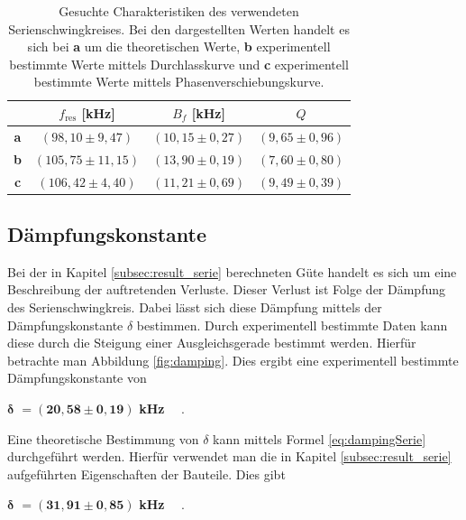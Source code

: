 \documentclass[a4paper,usenatbib]{aspdoc}
\begin{document}
            \begin{table}
                \centering
                \begin{tabular}{c|ccc}
                    \multicolumn{1}{c}{} & \multicolumn{1}{c}{$f_{\mathrm{res}}$ [kHz]} & \multicolumn{1}{c}{$B_f$ [kHz]} & \multicolumn{1}{c}{$Q$} \\
                    \cmidrule(lr){2-2}\cmidrule(lr){3-3} \cmidrule(lr){4-4}
                    \toprule
                    \textbf{a}      & $(98,10 \pm 9,47)$  & $(10,15 \pm 0,27)$ & $(9,65 \pm 0,96)$ \\
                    \textbf{b}      & $(105,75 \pm 11,15)$ & $(13,90 \pm 0,19)$ & $(7,60 \pm 0,80)$ \\
                    \textbf{c}      & $(106,42 \pm 4,40)$ & $(11,21 \pm 0,69)$ & $(9,49 \pm 0,39)$ \\
                    \bottomrule
                \end{tabular}
                \caption{Gesuchte Charakteristiken des verwendeten Serienschwingkreises. Bei den dargestellten Werten handelt es sich bei \textbf{a} um die theoretischen Werte, \textbf{b} experimentell bestimmte Werte mittels Durchlasskurve und \textbf{c} experimentell bestimmte Werte mittels Phasenverschiebungskurve.}
                \label{tab:serie}
            \end{table}
        
        
        \subsection{Dämpfungskonstante}\label{subsec:result_damping}
            Bei der in Kapitel \ref{subsec:result_serie} berechneten Güte handelt es sich um eine Beschreibung der auftretenden Verluste. Dieser Verlust ist Folge der Dämpfung des Serienschwingkreis. Dabei lässt sich diese Dämpfung mittels der Dämpfungskonstante $\delta$ bestimmen. Durch experimentell bestimmte Daten kann diese durch die Steigung einer Ausgleichsgerade bestimmt werden. Hierfür betrachte man Abbildung \ref{fig:damping}.
            Dies ergibt eine experimentell bestimmte Dämpfungskonstante von
            \begin{center}
                $\bm{\delta}$ $\mathbf{ = (20,58 \pm 0,19)}$ \textbf{kHz} $\quad$.
            \end{center}
            Eine theoretische Bestimmung von $\delta$ kann mittels Formel \ref{eq:dampingSerie} durchgeführt werden. Hierfür verwendet man die in Kapitel \ref{subsec:result_serie} aufgeführten Eigenschaften der Bauteile.
            Dies gibt
            \begin{center}
                $\bm{\delta}$ $\mathbf{= (31,91 \pm 0,85)}$ \textbf{kHz} $\quad$.
            \end{center}
            
\end{document}
